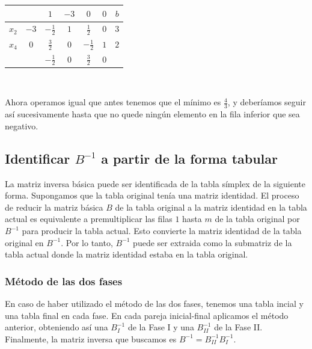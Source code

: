 \documentclass[PM.tex]{subfiles}
\begin{document}
\begin{tabular}{|c|c| c c| c c|c|}
\hline
 &            & $1$ & $-3$ & $0$ & $0$ & $b$  \\
 \hline
 $x_2$ & $-3$ & $-\frac{1}{2}$ & $1$ &   $\frac{1}{2}$ &   $0$ & $3$\\
  $x_4$ & $0$ & $\frac{3}{2}$ & $0$ &    $-\frac{1}{2}$ &  $1$ & $2$\\
 \hline
 &            & $\boxed{-\frac{1}{2}}$ & $0$ & $\frac{3}{2}$ & $0$ & \\
 \hline

\end{tabular}\

Ahora operamos igual que antes tenemos que el mínimo es $\frac{4}{3}$, y deberíamos seguir así sucesivamente hasta que no quede ningún elemento en la fila inferior que sea negativo.

\subsection{Identificar $B^{-1}$ a partir de la forma tabular}
La matriz inversa básica puede ser identificada de la tabla símplex de la siguiente forma. Supongamos que la tabla original tenía una matriz identidad.
El proceso de reducir la matriz básica $B$ de la tabla original a la matriz identidad en la tabla actual es equivalente a premultiplicar las filas $1$ hasta $m$ de la tabla original por $B^{-1}$ para producir la tabla actual.
Esto convierte la matriz identidad de la tabla original en $B^{-1}$.
Por lo tanto, $B^{-1}$ puede ser extraida como la submatriz de la tabla actual donde la matriz identidad estaba en la tabla original.
\subsubsection{Método de las dos fases}
En caso de haber utilizado el método de las dos fases, tenemos una tabla incial y una tabla final en cada fase. En cada pareja inicial-final aplicamos el método anterior, obteniendo así una $B_I^{-1}$ de la Fase I y una $B_{II}^{-1}$ de la Fase II. Finalmente, la matriz inversa que buscamos es $B^{-1}= B_{II}^{-1}B_I^{-1}$.
\end{document}
